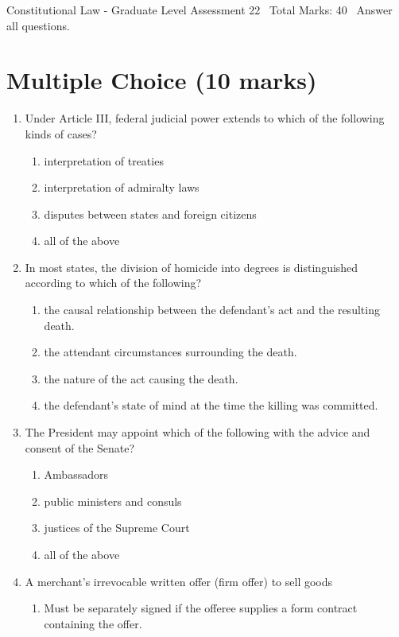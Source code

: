 \documentclass[12pt]{article}
\begin{document}
\begin{center}
Constitutional Law - Graduate Level Assessment 22 \
Total Marks: 40 \
Answer all questions.
\end{center}

\section*{Multiple Choice (10 marks)}
\begin{enumerate}[label=\arabic*.]
\item Under Article III, federal judicial power extends to which of the following kinds of cases?
\begin{enumerate}[label=(\alph*)]
    \item interpretation of treaties
    \item interpretation of admiralty laws
    \item disputes between states and foreign citizens
    \item all of the above
\end{enumerate}
\item In most states, the division of homicide into degrees is distinguished according to which of the following?
\begin{enumerate}[label=(\alph*)]
    \item the causal relationship between the defendant's act and the resulting death.
    \item the attendant circumstances surrounding the death.
    \item the nature of the act causing the death.
    \item the defendant's state of mind at the time the killing was committed.
\end{enumerate}
\item The President may appoint which of the following with the advice and consent of the Senate?
\begin{enumerate}[label=(\alph*)]
    \item Ambassadors
    \item public ministers and consuls
    \item justices of the Supreme Court
    \item all of the above
\end{enumerate}
\item A merchant's irrevocable written offer (firm offer) to sell goods
\begin{enumerate}[label=(\alph*)]
    \item Must be separately signed if the offeree supplies a form contract containing the offer.

\end{enumerate}
\end{enumerate}
\end{document}
